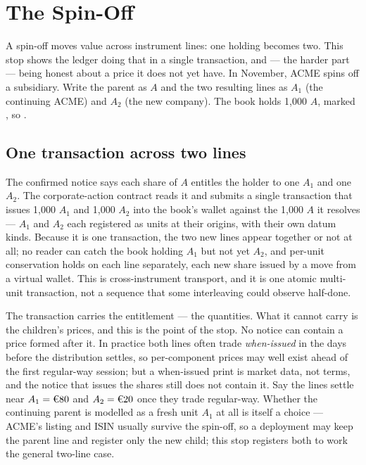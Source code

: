 \section{The Spin-Off}\label{sec:tour-spinoff}

A spin-off moves value across instrument lines: one holding becomes two. This stop
shows the ledger doing that in a single transaction, and --- the harder part --- being
honest about a price it does not yet have. In November, ACME spins off a subsidiary.
Write the parent as $A$ and the two resulting lines as $A_1$ (the continuing ACME) and
$A_2$ (the new company). The book holds 1{,}000 $A$, marked , so .

\subsection{One transaction across two lines}

The confirmed notice says each share of $A$ entitles the holder to one $A_1$ and one
$A_2$. The corporate-action contract reads it and submits a single transaction that
issues 1{,}000 $A_1$ and 1{,}000 $A_2$ into the book's wallet against the 1{,}000 $A$
it resolves --- $A_1$ and $A_2$ each registered as units at their origins, with their
own datum kinds. Because it is one transaction, the two new lines appear together or
not at all; no reader can catch the book holding $A_1$ but not yet $A_2$, and
per-unit conservation holds on each line separately, each new share issued by a move
from a virtual wallet. This is cross-instrument transport, and it is one atomic
multi-unit transaction, not a sequence that some interleaving could observe half-done.

The transaction carries the entitlement --- the quantities. What it cannot carry is the
children's prices, and this is the point of the stop. No notice can contain a price
formed after it. In practice both lines often trade \emph{when-issued} in the days
before the distribution settles, so per-component prices may well exist ahead of the
first regular-way session; but a when-issued print is market data, not terms, and the
notice that issues the shares still does not contain it. Say the lines settle near
$A_1 = \EUR{80}$ and $A_2 = \EUR{20}$ once they trade regular-way. Whether the
continuing parent is modelled as a fresh unit $A_1$ at all is itself a choice --- ACME's
listing and ISIN usually survive the spin-off, so a deployment may keep the parent line
and register only the new child; this stop registers both to work the general two-line
case.

